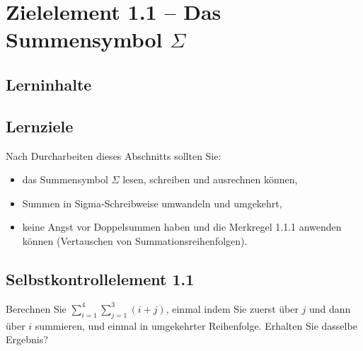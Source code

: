 \documentclass[a4paper,12pt]{article}
\begin{document}
\newpage

\section*{Zielelement 1.1 -- Das Summensymbol $\Sigma$}

\subsection*{Lerninhalte}

\begin{center}
\end{center}

\subsection*{Lernziele}

Nach Durcharbeiten dieses Abschnitts sollten Sie:
\begin{itemize}
  \item das Summensymbol $\Sigma$ lesen, schreiben und ausrechnen können,
  \item Summen in Sigma-Schreibweise umwandeln und umgekehrt,
  \item keine Angst vor Doppelsummen haben und die Merkregel 1.1.1 anwenden
        können (Vertauschen von Summationsreihenfolgen).
\end{itemize}

\subsection*{Selbstkontrollelement 1.1}

Berechnen Sie $\displaystyle\sum_{i=1}^{4}\sum_{j=1}^{3} (i+j)$, einmal indem Sie
zuerst über $j$ und dann über $i$ summieren, und einmal in umgekehrter Reihenfolge.
Erhalten Sie dasselbe Ergebnis?
\end{document}
